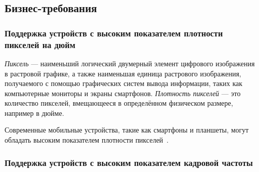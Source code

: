\subsection{Бизнес-требования}
\subsubsection{Поддержка устройств с высоким показателем плотности пикселей на дюйм}
\textit{Пиксель} --- наименьший логический двумерный элемент цифрового
изображения в растровой графике, а также наименьшая единица растрового
изображения, получаемого с помощью графических систем вывода информации,
таких как компьютерные мониторы и экраны смартфонов.
\textit{Плотность пикселей} --- это количество пикселей, вмещающееся в
определённом физическом размере, например в дюйме.


Современные мобильные устройства, такие как смартфоны и планшеты, могут
обладать высоким показателем плотности пикселей~\cite{device-ppi-stat}.
\subsubsection{Поддержка устройств с высоким показателем кадровой частоты}
